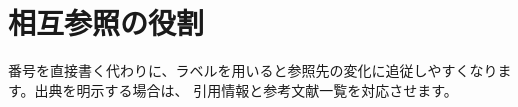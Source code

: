 \documentclass[dvipdfmx]{jlreq}
\begin{document}

\section{相互参照の役割}

番号を直接書く代わりに、ラベルを用いると参照先の変化に追従しやすくなります。出典を明示する場合は、
引用情報と参考文献一覧を対応させます。

\end{document}
